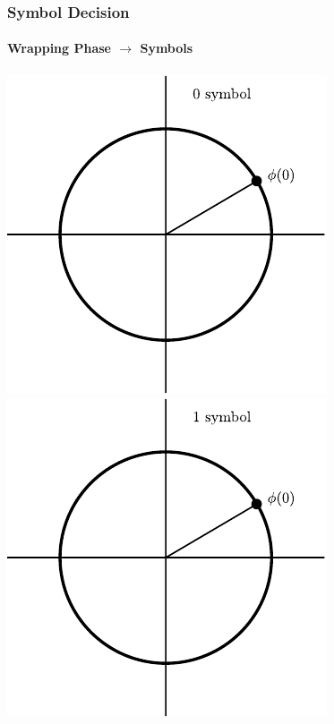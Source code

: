 \begin{frame} \frametitle{Symbol Decision}
    \framesubtitle{Wrapping Phase $\rightarrow$ Symbols}
    \begin{center}
         {
            \includegraphics[scale=0.7]{img/symboldecision_animation/0symbol1} \quad
            \includegraphics[scale=0.7]{img/symboldecision_animation/1symbol1}
        }


\end{center}
\end{frame}
